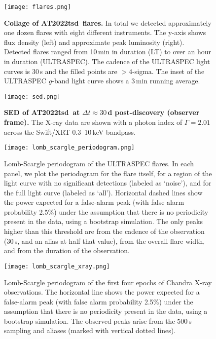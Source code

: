 \documentclass{nature_plusfigure}
\newcommand{\at}{AT2022tsd}
\begin{document}
\begin{extended_data}
\begin{figure}[ht]
 \centering
\texttt{[image: flares.png]}
  \caption{\textbf{Collage of \at\ flares.} In total we detected approximately one dozen flares with eight different instruments. The y-axis shows flux density (left) and approximate peak luminosity (right). Detected flares ranged from 10\,min in duration (LT) to over an hour in duration (ULTRASPEC). The cadence of the ULTRASPEC light curves is 30\,s and the filled points are $>4$-sigma. The inset of the ULTRASPEC $g$-band light curve shows a 3\,min running average.}
 \label{fig:flare-collage}
\end{figure}

\begin{figure}[!ht]
 \centering
\texttt{[image: sed.png]}
  \caption{\textbf{SED of \at\ at $\Delta t\approx30\,$d post-discovery (observer frame).} The X-ray data are shown with a photon index of $\Gamma=2.01$ across the Swift/XRT 0.3--10\,keV bandpass.}
 \label{fig:full-sed}
\end{figure}

\begin{figure*}[ht]
    \centering
    \texttt{[image: lomb\_scargle\_periodogram.png]}
    \caption{Lomb-Scargle periodogram of the ULTRASPEC flares. In each panel, we plot the periodogram for the flare itself, for a region of the light curve with no significant detections (labeled as `noise'), and for the full light curve (labeled as `all'). Horizontal dashed lines show the power expected for a false-alarm peak (with false alarm probability 2.5\%) under the assumption that there is no periodicity present in the data, using a bootstrap simulation. The only peaks higher than this threshold are from the cadence of the observation (30\,s, and an alias at half that value), from the overall flare width, and from the duration of the observation.}
    \label{fig:ultraspec-periodogram}
\end{figure*}

\begin{figure*}[!ht]
    \centering
    \texttt{[image: lomb\_scargle\_xray.png]}
    \caption{Lomb-Scargle periodogram of the first four epochs of Chandra X-ray observations. The horizontal line shows the power expected for a false-alarm peak (with false alarm probability 2.5\%) under the assumption that there is no periodicity present in the data, using a bootstrap simulation. The observed peaks arise from the 500\,s sampling and aliases (marked with vertical dotted lines).}
    \label{fig:xray-periodogram}
\end{figure*}


\end{extended_data}
\end{document}

